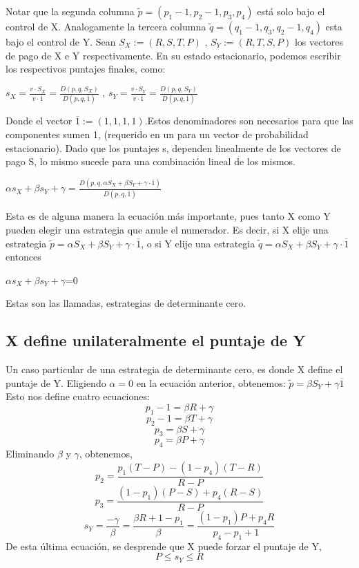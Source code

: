 \documentclass[12pt]{article}
\begin{document}
Notar que la segunda columna $\tilde{p}= (p_1-1,p_2-1,p_3,p_4)$ está solo bajo el control de X.
Analogamente la tercera columna $\tilde{q}=(q_1-1,q_3,q_2-1,q_4)$ esta bajo el control de Y.\newline
Sean $S_X:=(R,S,T,P)$ , $S_Y:=(R,T,S,P)$ los vectores de pago de X e Y respectivamente.
En su estado estacionario, podemos escribir los respectivos puntajes finales, como:
\begin{center}
$s_X=\frac{v \cdot S_X}{v \cdot \overline1} = \frac{D(p,q,S_X)}{D(p,q,\overline1)}$ , 
$s_Y=\frac{v \cdot S_Y}{v \cdot \overline1} = \frac{D(p,q,S_Y)}{D(p,q,\overline1)}$
\end{center}
Donde el vector $\overline1:=(1,1,1,1)$.Estos denominadores son necesarios para que las
componentes sumen 1, (requerido en un para un vector de probabilidad estacionario).
Dado que los puntajes s, dependen linealmente de los vectores de pago S, lo mismo
sucede para una combinación lineal de los mismos.
\begin{center}
 $\alpha s_X + \beta s_Y + \gamma=\frac{D(p,q,\alpha S_X + \beta S_Y + \gamma\cdot \overline1)}{D(p,q,\overline1)}$
\end{center}
Esta es de alguna manera la ecuación más importante, pues tanto X como Y pueden elegir una
estrategia que anule el numerador. Es decir, si X elije una estrategia 
$\tilde{p}= \alpha S_X + \beta S_Y + \gamma\cdot \overline1$, o si Y elije una estrategia
$\tilde{q}= \alpha S_X + \beta S_Y + \gamma\cdot \overline1$ entonces 

\begin{center}
$\alpha s_X + \beta s_Y + \gamma$=0
\end{center}
Estas son las llamadas, estrategias de determinante cero.

\subsection{X define unilateralmente el puntaje de Y}
Un caso particular de una estrategia de determinante cero, es donde X define el puntaje de Y.
Eligiendo $\alpha=0$ en la ecuación anterior, obtenemos: $\tilde{p}=\beta S_Y + \gamma \overline1$
Esto nos define cuatro ecuaciones:
$$p_1-1=\beta R + \gamma$$
$$p_2-1=\beta T + \gamma$$
$$p_3=\beta S + \gamma$$
$$p_4=\beta P + \gamma$$
Eliminando $\beta$ y $\gamma$, obtenemos,
$$p_2=\frac{p_1(T-P)-(1-p_4)(T-R)}{R-P}$$
$$p_3=\frac{(1-p_1)(P-S)+p_4(R-S)}{R-P}$$
$$s_Y=\frac{-\gamma}{\beta}=\frac{\beta R+ 1-p_1}{\beta}=\frac{(1-p_1)P+p_4 R}{p_4-p_1+1}$$
De esta última ecuación, se desprende que X puede forzar el puntaje de Y,
$$P\leq s_Y\leq R $$
\end{document}

